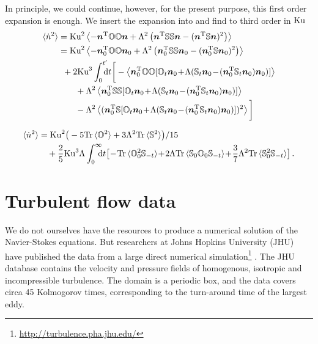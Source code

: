 \documentclass[thesis.tex]{subfiles}
\begin{document}
In principle, we could continue, however, for the present purpose, this first order expansion is enough.
We insert the expansion  into  and find to third order in $\mbox{Ku}$
\begin{align*}
	\langle \dot n^2\rangle &= \ku^2\left\langle-\ve n\transpose \ma O \ma O \ve n + \Lambda^2\left(\ve n\transpose\ma S\ma S\ve n - (\ve n\transpose\ma S\ve n)^2\right)\right\rangle\\
	&= \ku^2\left\langle-\ve n_0\transpose \ma O \ma O \ve n_0 + \Lambda^2\left(\ve n_0\transpose\ma S\ma S\ve n_0 - (\ve n_0\transpose\ma S\ve n_0)^2\right)\right\rangle \\
	&\,\,\,+ 2\ku^3 \int_0^{t'}\!\!\!\!{\rm d}t \bigg[
	 - \left\langle\ve n_0\transpose \ma O \ma O [\ma O_{t}\ve n_{0}\! +\!\Lambda(\ma S_{t}\ve n_{0}\!-\!(\ve n_{0}\transpose\ma S_{t}\ve n_{0})\ve n_{0})] \right\rangle\\
	&\qquad+\Lambda^2\left\langle\ve n_0\transpose\ma S\ma S[\ma O_{t}\ve n_{0}\! +\!\Lambda(\ma S_{t}\ve n_{0}\!-\!(\ve n_{0}\transpose\ma S_{t}\ve n_{0})\ve n_{0})] \right\rangle\\
	&\qquad - \Lambda^2\left\langle(\ve n_0\transpose\ma S[\ma O_{t}\ve n_{0}\! +\!\Lambda(\ma S_{t}\ve n_{0}\!-\!(\ve n_{0}\transpose\ma S_{t}\ve n_{0})\ve n_{0})])^2\right\rangle\bigg]
\end{align*}











\begin{align}
\eqnlab{expansion_general}
\langle{\dot n^2}\rangle&={\rm Ku}^2 \big(-5\tr\,\langle{\ma O}^2\rangle+ 3\Lambda^2\tr\,\langle{\ma S}^2\rangle\big)/15 \\&
\quad+\frac{2}{5}\ku^3\Lambda\int_0^\infty\!\!\!\!\rd t
\big[ \!-\!\tr\,\langle\ma O_0^2\ma S_{-t}\rangle
\!+\!2\Lambda\tr\,\langle\ma S_0\ma O_0\ma S_{-t}\rangle
\!+\!\frac{3}{7}\Lambda^2\tr\,\langle\ma S_0^2\ma S_{-t}\rangle
\big]\,.\nn
\end{align}


\section{Turbulent flow data}

We do not ourselves have the resources to produce a numerical solution of the Navier-Stokes equations. But researchers at Johns Hopkins University (JHU) have published the data from a large direct numerical simulation\footnote{\url{http://turbulence.pha.jhu.edu/}} \cite{li2008}. The JHU database contains the velocity and pressure fields of homogenous, isotropic and incompressible turbulence. The domain is a periodic box, and the data covers circa 45 Kolmogorov times, corresponding to the turn-around time of the largest eddy. 
\end{document}
